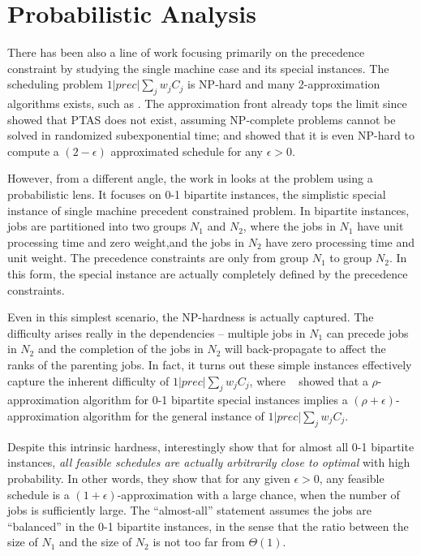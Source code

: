 \section{Probabilistic Analysis} \label{s:bism}
There has been also a line of work focusing primarily on the precedence constraint by studying the single machine case and its special instances. The scheduling problem $1|prec|\sum_jw_jC_j$ is NP-hard and many 2-approximation algorithms exists, such as \cite{hall1997scheduling}. The approximation front already tops the limit since \cite{ambuhl2007inapproximability} showed that PTAS does not exist, assuming NP-complete problems cannot be solved in randomized subexponential time; and \cite{bansal2009optimal} showed that it is even NP-hard to compute a $(2-\epsilon)$ approximated schedule for any $\epsilon> 0$. 

However, from a different angle, the work in \cite{schulz2011near} looks at the problem using a probabilistic lens. It focuses on 0-1 bipartite instances, the simplistic special instance of single machine precedent constrained problem. In bipartite instances, jobs are partitioned into two groups $N_1$ and $N_2$, where the jobs in $N_1$ have unit processing time and zero weight,and the jobs in $N_2$ have zero processing time and unit weight. The precedence constraints are only from group $N_1$ to group $N_2$. In this form, the special instance are  actually completely defined by the precedence constraints.

Even in this simplest scenario, the NP-hardness is actually captured. The difficulty arises really in the dependencies -- multiple jobs in $N_1$ can precede jobs in $N_2$ and the completion of the jobs in $N_2$ will back-propagate to affect the ranks of the parenting jobs. In fact, it turns out these simple instances effectively capture the inherent difficulty of $1|prec|\sum_jw_jC_j$, where ~\cite{woeginger2003approximability} showed that a $\rho$-approximation algorithm for 0-1 bipartite special instances implies a $(\rho+\epsilon)$-approximation algorithm for the general instance of $1|prec|\sum_jw_jC_j$.

Despite this intrinsic hardness, \cite{schulz2011near} interestingly show that for almost all 0-1 bipartite instances, \emph{all feasible schedules are actually arbitrarily close to optimal} with high probability. In other words, they show that for any given $\epsilon > 0$, any feasible schedule is a  $(1 + \epsilon)$-approximation with a large chance, when the number of jobs is sufficiently large. The ``almost-all'' statement assumes the jobs are “balanced” in the 0-1 bipartite instances, in the sense that the ratio between the size of $N_1$ and the size of $N_2$ is not too far from $\Theta(1)$.

